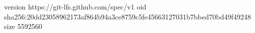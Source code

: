 version https://git-lfs.github.com/spec/v1
oid sha256:20dd23058962173af864b94a3ce8759c5fe45663127031b7bbed70bd49f49248
size 5592560
